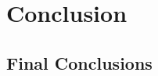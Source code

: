 \chapter{Conclusion}
\label{ch:conclusion}

\section{Final Conclusions}
\label{ch:conclusion:final}

